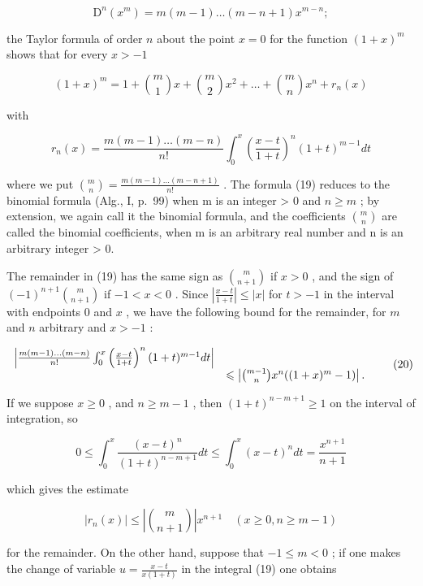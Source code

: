 \[
\mathrm{D} ^ {n} (x ^ {m}) = m (m - 1) \dots (m - n + 1) x ^ {m - n};
\]

the Taylor formula of order \(n\) about the point \(x = 0\) for the function \((1 + x)^m\) shows that for every \(x > -1\)

\[
(1 + x) ^ {m} = 1 + \binom {m} {1} x + \binom {m} {2} x ^ {2} + \dots + \binom {m} {n} x ^ {n} + r _ {n} (x)\tag{19}
\]

with

\[
r _ {n} (x) = \frac {m (m - 1) \dots (m - n)}{n !} \int_ {0} ^ {x} \left(\frac {x - t}{1 + t}\right) ^ {n} (1 + t) ^ {m - 1} d t
\]

where we put \(\binom{m}{n} = \frac{m(m-1)\ldots(m-n+1)}{n!}\) . The formula (19) reduces to the binomial formula (Alg., I, p.~99) when m is an integer \textgreater{} 0 and \(n \geqslant m\) ; by extension, we again call it the binomial formula, and the coefficients \(\binom{m}{n}\) are called the binomial coefficients, when m is an arbitrary real number and n is an arbitrary integer \textgreater{} 0.

The remainder in (19) has the same sign as \(\binom{m}{n+1}\) if \(x > 0\) , and the sign of \((-1)^{n+1}\binom{m}{n+1}\) if \(-1 < x < 0\) . Since \(\left|\frac{x-t}{1+t}\right| \leqslant |x|\) for \(t > -1\) in the interval with endpoints 0 and \(x\) , we have the following bound for the remainder, for \(m\) and \(n\) arbitrary and \(x > -1\) :

\[
\begin{array}{r l} \left| \frac {m (m - 1) \dots (m - n)}{n !} \int_ {0} ^ {x} \left(\frac {x - t}{1 + t}\right) ^ {n} (1 + t) ^ {m - 1} d t \right| & \\ & \leqslant \left| \binom {m - 1} {n} x ^ {n} ((1 + x) ^ {m} - 1) \right|. \end{array}\tag{20}
\]

If we suppose \(x \geqslant 0\) , and \(n \geqslant m - 1\) , then \((1 + t)^{n - m + 1} \geqslant 1\) on the interval of integration, so

\[
0 \leqslant \int_ {0} ^ {x} \frac {(x - t) ^ {n}}{(1 + t) ^ {n - m + 1}} d t \leqslant \int_ {0} ^ {x} (x - t) ^ {n} d t = \frac {x ^ {n + 1}}{n + 1}
\]

which gives the estimate

\[
\left| r _ {n} (x) \right| \leqslant \left| \binom {m} {n + 1} \right| x ^ {n + 1} \quad (x \geqslant 0, n \geqslant m - 1)\tag{21}
\]

for the remainder. On the other hand, suppose that \(-1 \leqslant m < 0\) ; if one makes the change of variable \(u = \frac{x - t}{x(1 + t)}\) in the integral (19) one obtains

